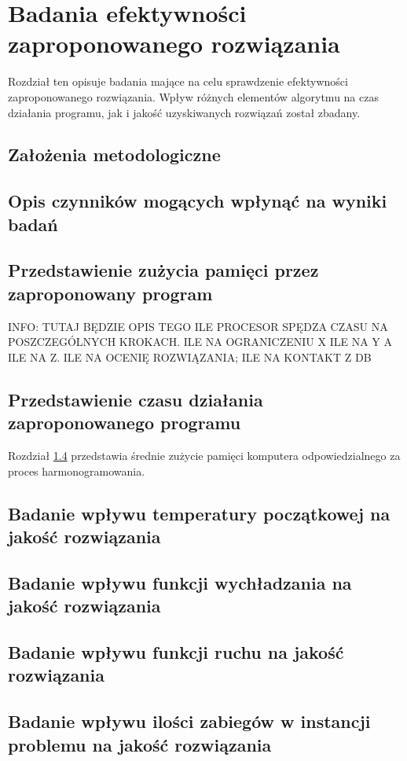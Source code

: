 \chapter{Badania efektywności zaproponowanego rozwiązania}
Rozdział ten opisuje badania mające na celu sprawdzenie efektywności
zaproponowanego rozwiązania. Wpływ różnych elementów algorytmu na czas działania programu, jak i jakość
uzyskiwanych rozwiązań został zbadany.

\section{Założenia metodologiczne}
\section{Opis czynników mogących wpłynąć na wyniki badań}

\section{Przedstawienie zużycia pamięci przez zaproponowany program}
INFO: TUTAJ BĘDZIE OPIS TEGO ILE PROCESOR SPĘDZA CZASU NA POSZCZEGÓLNYCH KROKACH. ILE
NA OGRANICZENIU X ILE NA Y A ILE NA Z. ILE NA OCENIĘ ROZWIĄZANIA; ILE NA
KONTAKT Z DB

\section{Przedstawienie czasu działania zaproponowanego programu} \label{section:memory-usage}
Rozdział \ref{section:memory-usage} przedstawia średnie zużycie pamięci
komputera odpowiedzialnego za proces harmonogramowania.

\section{Badanie wpływu temperatury początkowej na jakość rozwiązania}
\section{Badanie wpływu funkcji wychładzania na jakość rozwiązania}
\section{Badanie wpływu funkcji ruchu na jakość rozwiązania}
\section{Badanie wpływu ilości zabiegów w instancji problemu na jakość rozwiązania}
